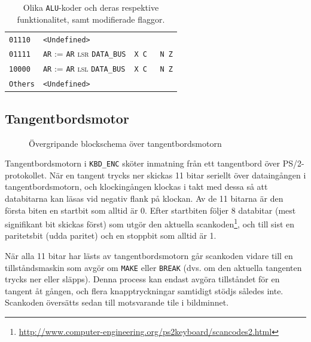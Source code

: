 \documentclass[]{article}
\begin{document}
\begin{table}[H]
\begin{tabular}{llc}
	\texttt{01110}  & \texttt{<Undefined>}                                   &  \\
	\texttt{01111}  & \texttt{AR} := \texttt{AR} \textsc{lsr} \texttt{DATA\_BUS}                       &  \texttt{X C { } N Z}    \\
	\texttt{10000}  & \texttt{AR} := \texttt{AR} \textsc{lsl} \texttt{DATA\_BUS}                       &  \texttt{X C { } N Z}    \\
	\texttt{Others} & \texttt{<Undefined>}                                   &
\end{tabular}
\caption{Olika \texttt{ALU}-koder och deras respektive funktionalitet, samt modifierade flaggor.}
\end{table}

\newpage
\subsection{Tangentbordsmotor}

\begin{figure}[h!]
	\caption{Övergripande blockschema över tangentbordsmotorn}
\end{figure}
\noindent
Tangentbordsmotorn i \texttt{KBD\_ENC} sköter inmatning från ett tangentbord över PS/2-protokollet. När en tangent trycks ner skickas 11 bitar seriellt över dataingången i tangentbordsmotorn, och klockingången klockas i takt med dessa så att databitarna kan läsas vid negativ flank på klockan. Av de 11 bitarna är den första biten en startbit som alltid är 0. Efter startbiten följer 8 databitar (mest signifikant bit skickas först)  som utgör den aktuella scankoden\footnote{\url{http://www.computer-engineering.org/ps2keyboard/scancodes2.html}}, och till sist en paritetsbit (udda paritet) och en stoppbit som alltid är 1.

När alla 11 bitar har lästs av tangentbordsmotorn går scankoden vidare till en tillståndsmaskin som avgör om \texttt{MAKE} eller \texttt{BREAK} (dvs. om den aktuella tangenten trycks ner eller släpps). Denna process kan endast avgöra tillståndet för en tangent åt gången, och flera knapptryckningar samtidigt stödjs således inte. Scankoden översätts sedan till motsvarande tile i bildminnet.
\end{document}
